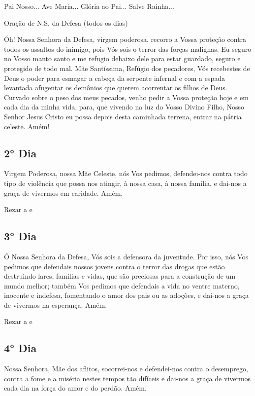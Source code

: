 \documentclass[a4paper,14pt]{extarticle} \usepackage[utf8]{inputenc}
\begin{document}
Pai Nosso... Ave Maria... Glória ao Pai... Salve Rainha...  

Oração de N.S. da Defesa  (todos os dias)

Óh! Nossa Senhora da Defesa, virgem poderosa, recorro a Vossa proteção contra todos os assaltos do inimigo, pois Vós sois o terror das forças malignas. Eu seguro no Vosso manto santo e me refugio debaixo dele para estar guardado, seguro e protegido de todo mal. Mãe Santíssima, Refúgio dos pecadores, Vós recebestes de Deus o poder para esmagar a cabeça da serpente infernal e com a espada levantada afugentar os demônios que querem acorrentar os filhos de Deus. Curvado sobre o peso dos meus pecados, venho pedir a Vossa proteção hoje e em cada dia da minha vida, para, que vivendo na luz do Vosso Divino Filho, Nosso Senhor Jesus Cristo eu possa depois desta caminhada terrena, entrar na pátria celeste. Amém!


\subsection{2° Dia}

Virgem Poderosa, nossa Mãe Celeste, nós Vos pedimos, defendei-nos contra todo tipo de violência que possa nos atingir, à nossa casa, à nossa família, e dai-nos a graça de vivermos em caridade. Amém. 

Rezar a \textbf{} e \textbf{}


\subsection{3° Dia}

Ó Nossa Senhora da Defesa, Vós sois a defensora da juventude. Por isso, nós Vos pedimos que defendais nossos jovens contra o terror das drogas que estão destruindo lares, famílias e vidas, que são preciosas para a construção de um mundo melhor; também Vos pedimos que defendais a vida no ventre materno, inocente e indefesa, fomentando o amor dos pais ou as adoções, e dai-nos a graça de vivermos na esperança. Amém.

Rezar a \textbf{} e \textbf{}


\subsection{4° Dia}

Nossa Senhora, Mãe dos aflitos, socorrei-nos e defendei-nos contra o desemprego, contra a fome e a miséria nestes tempos tão difíceis e dai-nos a graça de vivermos cada dia na força do amor e do perdão. Amém.
\end{document}

